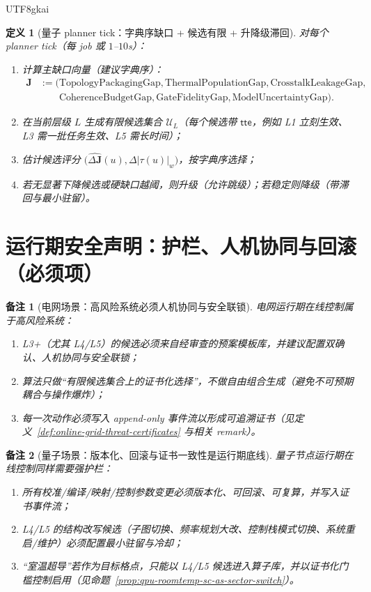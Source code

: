 \documentclass[12pt]{article}
\newtheorem{definition}{定义}[section]
\newtheorem{remark}{备注}[section]
\begin{document}
\begin{CJK*}{UTF8}{gkai}
\begin{definition}[量子 planner tick：字典序缺口 + 候选有限 + 升降级滞回]
\label{def:online-qpu-policy}
对每个 planner tick（每 job 或 $1$--$10$s）：
\begin{enumerate}
  \item 计算主缺口向量（建议字典序）：
  \[
    \begin{aligned}
      \mathbf{J}
      &:=
      \bigl(
        \mathrm{TopologyPackagingGap},\mathrm{ThermalPopulationGap},\mathrm{CrosstalkLeakageGap},\\
        &\qquad \mathrm{CoherenceBudgetGap},\mathrm{GateFidelityGap},\mathrm{ModelUncertaintyGap}
      \bigr).
    \end{aligned}
  \]
  \item 在当前层级 $L$ 生成有限候选集合 $\mathcal{U}_L$（每个候选带 $\mathsf{tte}$，例如 L1 立刻生效、L3 需一批任务生效、L5 需长时间）；
  \item 估计候选评分 $\bigl(\widehat{\Delta\mathbf{J}}(u),\Delta|\tau(u)|_w\bigr)$，按字典序选择；
  \item 若无显著下降候选或硬缺口越阈，则升级（允许跳级）；若稳定则降级（带滞回与最小驻留）。
\end{enumerate}
\end{definition}

\section{运行期安全声明：护栏、人机协同与回滚（必须项）}
\label{sec:online-safety-guards}

\begin{remark}[电网场景：高风险系统必须人机协同与安全联锁]
电网运行期在线控制属于高风险系统：
\begin{enumerate}
  \item L3+（尤其 L4/L5）的候选必须来自经审查的预案模板库，并建议配置双确认、人机协同与安全联锁；
  \item 算法只做“有限候选集合上的证书化选择”，不做自由组合生成（避免不可预期耦合与操作爆炸）；
  \item 每一次动作必须写入 append-only 事件流以形成可追溯证书（见定义~\ref{def:online-grid-threat-certificates} 与相关 remark）。
\end{enumerate}
\end{remark}

\begin{remark}[量子场景：版本化、回滚与证书一致性是运行期底线]
量子节点运行期在线控制同样需要强护栏：
\begin{enumerate}
  \item 所有校准/编译/映射/控制参数变更必须版本化、可回滚、可复算，并写入证书事件流；
  \item L4/L5 的结构改写候选（子图切换、频率规划大改、控制栈模式切换、系统重启/维护）必须配置最小驻留与冷却；
  \item “室温超导”若作为目标格点，只能以 L4/L5 候选进入算子库，并以证书化门槛控制启用（见命题~\ref{prop:qpu-roomtemp-sc-as-sector-switch}）。
\end{enumerate}
\end{remark}


\end{CJK*}
\end{document}
